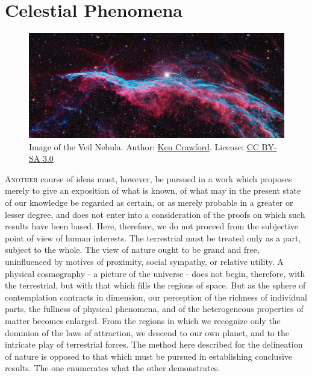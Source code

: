 
\chapter{Celestial Phenomena}

\begin{figure}[h]
   \vspace{-40pt}
   \centering
   \includegraphics[width=\linewidth]{../../pictures/2560px-Veil_Nebula_-_NGC6960.jpg}
   \captionsetup{width = \linewidth}
   \caption{\footnotesize Image of the Veil Nebula. Author: \href{https://commons.wikimedia.org/wiki/File:Veil_Nebula_-_NGC6960.jpg}{Ken Crawford}.
      License: \href{https://creativecommons.org/licenses/by-sa/3.0/deed.en}{CC BY-SA 3.0}
   }
   \vspace*{\fill}
\end{figure}
\clearpage

\lettrine[lines=4]{\goudy A}{nother} course of ideas must, however, be pursued in a work which proposes merely to give an exposition of what is known, of what may in the present state of our knowledge be regarded as certain, or as merely probable in a greater or lesser degree, and does not enter into a consideration of the proofs on which such results have been based. Here, therefore, we do not proceed from the subjective point of view of human interests. The terrestrial must be treated only as a part, subject to the whole. The view of nature ought to be grand and free, uninfluenced by motives of proximity, social sympathy, or relative utility. A physical cosmography - a picture of the universe - does not begin, therefore, with the terrestrial, but with that which fills the regions of space. But as the sphere of contemplation contracts in dimension, our perception of the richness of individual parts, the fullness of physical phenomena, and of the heterogeneous properties of matter becomes enlarged. From the regions in which we recognize only the dominion of the laws of attraction, we descend to our own planet, and to the intricate play of terrestrial forces. The method here described for the delineation of nature is opposed to that which must be pursued in establishing conclusive results. The one enumerates what the other demonstrates.

